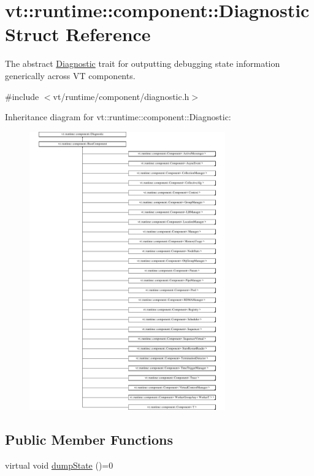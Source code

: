 \hypertarget{structvt_1_1runtime_1_1component_1_1_diagnostic}{}\section{vt\+:\+:runtime\+:\+:component\+:\+:Diagnostic Struct Reference}
\label{structvt_1_1runtime_1_1component_1_1_diagnostic}


The abstract {\ttfamily \hyperlink{structvt_1_1runtime_1_1component_1_1_diagnostic}{Diagnostic}} trait for outputting debugging state information generically across VT components.  




{\ttfamily \#include $<$vt/runtime/component/diagnostic.\+h$>$}

Inheritance diagram for vt\+:\+:runtime\+:\+:component\+:\+:Diagnostic\+:\begin{figure}[H]
\begin{center}
\leavevmode
\includegraphics[height=12.000000cm]{structvt_1_1runtime_1_1component_1_1_diagnostic}
\end{center}
\end{figure}
\subsection*{Public Member Functions}
\begin{DoxyCompactItemize}
\item 
virtual void \hyperlink{structvt_1_1runtime_1_1component_1_1_diagnostic_a1b6da987a14917c7ee8a4d00138e62e6}{dump\+State} ()=0
\end{DoxyCompactItemize}


